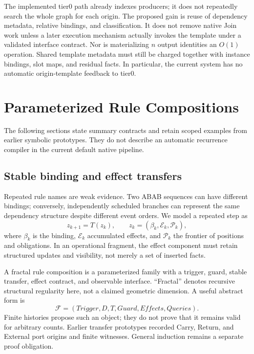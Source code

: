 \documentclass[11pt,a4paper]{article}
\begin{document}
The implemented tier0 path already indexes producers; it does not repeatedly
search the whole graph for each origin. The proposed gain is reuse of dependency
metadata, relative bindings, and classification. It does not remove native Join
work unless a later execution mechanism actually invokes the template under a
validated interface contract. Nor is materializing $n$ output identities an
$O(1)$ operation. Shared template metadata must still be charged together with
instance bindings, slot maps, and residual facts. In particular, the current
system has no automatic origin-template feedback to tier0.

\section{Parameterized Rule Compositions}
The following sections state summary contracts and retain scoped examples from
earlier symbolic prototypes. They do not describe an automatic recurrence
compiler in the current default native pipeline.
\subsection{Stable binding and effect transfers}
Repeated rule names are weak evidence. Two ABAB sequences can have different
bindings; conversely, independently scheduled branches can represent the same
dependency structure despite different event orders. We model a repeated step as
\begin{equation}
 z_{k+1}=T(z_k),\qquad z_k=(\beta_k,\mathcal E_k,\mathcal P_k),
\end{equation}
where $\beta_k$ is the binding, $\mathcal E_k$ accumulated effects, and
$\mathcal P_k$ the frontier of positions and obligations. In an operational fragment, the effect component must retain
structured updates and visibility, not merely a set of inserted facts.

A fractal rule composition is a parameterized family with a trigger, guard, stable transfer,
effect contract, and observable interface. ``Fractal'' denotes recursive
structural regularity here, not a claimed geometric dimension. A useful abstract
form is
\begin{equation}
 \mathcal F=(\mathit{Trigger},D,T,\mathit{Guard},\mathit{Effects},\mathit{Queries}).
\end{equation}
Finite histories propose such an object; they do not prove that it remains valid
for arbitrary counts. Earlier transfer prototypes recorded Carry, Return, and
External port origins and finite witnesses. General induction remains a separate
proof obligation.
\end{document}
